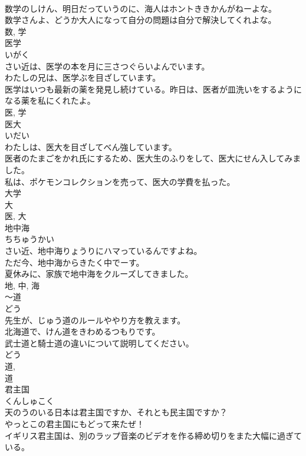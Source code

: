 \documentclass[8pt]{extreport}
\begin{document}
\begin{CJK}{UTF8}{min}
\\	数学のしけん、明日だっていうのに、海人はホントききかんがねーよな。	
\\	数学さんよ、どうか大人になって自分の問題は自分で解決してくれよな。	
\\	数, 学	
\\	医学	
\\	いがく	
\\	さい近は、医学の本を月に三さつぐらいよんでいます。	
\\	わたしの兄は、医学ぶを目ざしています。	
\\	医学はいつも最新の薬を発見し続けている。昨日は、医者が皿洗いをするようになる薬を私にくれたよ。	
\\	医, 学	
\\	医大	
\\	いだい	
\\	わたしは、医大を目ざしてべん強しています。	
\\	医者のたまごをかれ氏にするため、医大生のふりをして、医大にせん入してみました。	
\\	私は、ポケモンコレクションを売って、医大の学費を払った。	
\\	大学 
\\	大 
\\	医, 大	
\\	地中海	
\\	ちちゅうかい	
\\	さい近、地中海りょうりにハマっているんですよね。	
\\	ただ今、地中海からきたく中でーす。	
\\	夏休みに、家族で地中海をクルーズしてきました。	
\\	地, 中, 海	
\\	〜道	
\\	どう	
\\	先生が、じゅう道のルールややり方を教えます。	
\\	北海道で、けん道をきわめるつもりです。	
\\	武士道と騎士道の違いについて説明してください。	
\\	どう 
\\	道, 
\\	道	
\\	君主国	
\\	くんしゅこく	
\\	天のうのいる日本は君主国ですか、それとも民主国ですか？	
\\	やっとこの君主国にもどって来たぜ！	
\\	イギリス君主国は、別のラップ音楽のビデオを作る締め切りをまた大幅に過ぎている。	

\end{CJK}
\end{document}
